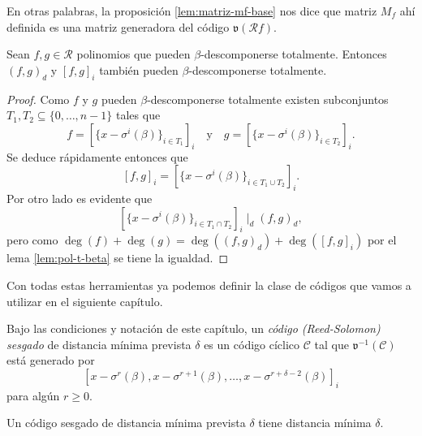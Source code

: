 En otras palabras, la proposición \ref{lem:matriz-mf-base} nos dice que matriz \(M_f\) ahí definida es una matriz generadora del código \(\mathfrak v(\mathcal R f)\).

\begin{lemma}
  \label{lem:b-descomposicion-mcm-mcd}
  Sean \(f, g \in \mathcal R\) polinomios que pueden \(\beta\)-descomponerse totalmente.
  Entonces \((f, g)_d\) y \([f, g]_i\) también pueden \(\beta\)-descomponerse totalmente.
\end{lemma}

\begin{proof}
  Como \(f\) y \(g\) pueden \(\beta\)-descomponerse totalmente existen subconjuntos \(T_1, T_2 \subseteq \{0, \dots, n - 1\}\) tales que 
  \[
    f = \left[\{x - \sigma^i(\beta)\}_{i \in T_1}\right]_i \quad \text{y} \quad g = \left[\{x - \sigma^i(\beta)\}_{i \in T_2}\right]_i.
  \]
  Se deduce rápidamente entonces que
  \[
    [f, g]_i = \left[\{x - \sigma^i(\beta)\}_{i \in T_1 \cup T_2}\right]_i.
  \]
  Por otro lado es evidente que 
  \[
    \left[\{x - \sigma^i(\beta)\}_{i \in T_1 \cap T_2}\right]_i \mid_d (f, g)_d,
  \]
  pero como \(\deg(f) + \deg(g) = \deg((f, g)_d) + \deg([f, g]_i)\) por el lema \ref{lem:pol-t-beta} se tiene la igualdad.
\end{proof}

Con todas estas herramientas ya podemos definir la clase de códigos que vamos a utilizar en el siguiente capítulo.

\begin{definition}
  Bajo las condiciones y notación de este capítulo, un \emph{código  (Reed-Solomon) sesgado} de distancia mínima prevista \(\delta\) es un código cíclico \(\mathcal C\) tal que \(\mathfrak v^{-1}(\mathcal C)\) está generado por 
  \[
    \left[x - \sigma^r(\beta), x - \sigma^{r+1}(\beta), \dots, x - \sigma^{r+\delta-2}(\beta)\right]_i
  \] 
  para algún \(r \geq 0\).
\end{definition}

\begin{theorem}
  \label{th:distancia-skew-rs}
  Un código  sesgado de distancia mínima prevista \(\delta\) tiene distancia mínima \(\delta\).
\end{theorem}

